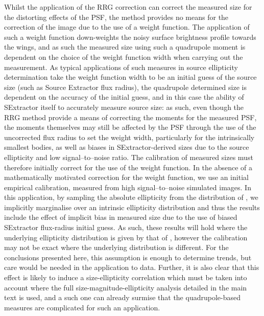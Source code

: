\documentclass[useAMS,usenatbib,times,letter,amssymb]{mn2e}
\begin{document}
Whilst the application of the RRG correction can correct the measured size for the distorting effects of the PSF, the method provides no means for the correction of the image due to the use of a weight function. The application of such a weight function down-weights the noisy surface brightness profile towards the wings, and as such the measured size using such a quadrupole moment is dependent on the choice of the weight function width when carrying out the measurement. As typical applications of such measures in source ellipticity determination take the weight function width to be an initial guess of the source size (such as Source Extractor flux radius), the quadrupole determined size is dependent on the accuracy of the initial guess, and in this case the ability of SExtractor itself to accurately measure source size: as such, even though the RRG method provide a means of correcting the moments for the measured PSF, the moments themselves may still be affected by the PSF through the use of the uncorrected flux radius to set the weight width, particularly for the intrinsically smallest bodies, as well as biases in SExtractor-derived sizes due to the source ellipticity and low signal--to--noise ratio. The calibration of measured sizes must therefore initially correct for the use of the weight function. In the absence of a mathematically motivated correction for the weight function, we use an initial empirical calibration, measured from high signal--to--noise simulated images. In this application, by sampling the absolute ellipticity from the distribution of \cite{Miller:2013p2259}, we implicitly marginalise over an intrinsic ellipticity distribution and thus the results include the effect of implicit bias in measured size due to the use of biased SExtractor flux-radius initial guess. As such, these results will hold where the underlying ellipticity distribution is given by that of \cite{Miller:2013p2259}, however the calibration may not be exact where the underlying distribution is different. For the conclusions presented here, this assumption is enough to determine trends, but care would be needed in the application to data. Further, it is also clear that this effect is likely to induce a size-ellipticity correlation which must be taken into account where the full size-magnitude-ellipticity analysis detailed in the main text is used, and a such one can already surmise that the quadrupole-based measures are complicated for such an application.
\end{document}
